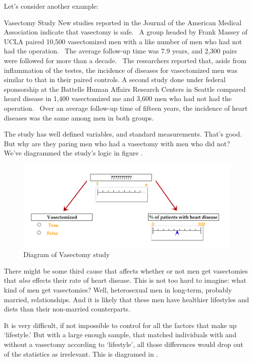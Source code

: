 \begin{refsection}
Let's consider another example:

\begin{apatextbox}{Vasectomy Study}
New studies reported in the Journal of the American Medical Association indicate that vasectomy is safe.  A group headed by Frank Massey of UCLA paired 10,500 vasectomized men with a like number of men who had not had the operation.  The average follow-up time was 7.9 years, and 2,300 pairs were followed for more than a decade.  The researchers reported that, aside from inflammation of the testes, the incidence of diseases for vasectomized men was similar to that in their paired controls.\newline
A second study done under federal sponsorship at the Battelle Human Affairs Research Centers in Seattle compared heard disease in 1,400 vasectomized me and 3,600 men who had not had the operation.  Over an average follow-up time of fifteen years, the incidence of heart diseases was the same among men in both groups. \end{apatextbox}

The study has well defined variables, and standard measurements. That's good. But why are they paring men who had a vasectomy with men who did not? We've diagrammed the study's logic in figure .
\begin{figure}\includegraphics{../images/hypothesis4.png}\caption{Diagram of Vasectomy study}\label{fig:hypothesis4}\end{figure}

There might be some third cause that affects whether or not men get vasectomies that \emph{also} effects their rate of heart disease. This is not too hard to imagine: what kind of men get vasectomies? Well, heterosexual men in long-term, probably married, relationships. And it is likely that these men have healthier lifestyles and diets than their non-married counterparts. 

It is very difficult, if not impossible to control for all the factors that make up `lifestyle.' But with a large enough sample, that matched individuals with and without a vasectomy according to `lifestyle', all those differences would drop out of the statistics as irrelevant. This is diagramed in .


\end{refsection}
